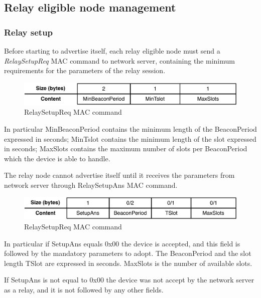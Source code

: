 \subsection{Relay eligible node management}

\subsubsection{Relay setup}

Before starting to advertise itself, each relay eligible node must send a \emph{RelaySetupReq} MAC command to network server, containing the minimum requirements for the parameters of the relay session.

\begin{figure}[!h]
\centering
\includegraphics[width=\textwidth]{img/commands/RelaySetupReq}
\caption{RelaySetupReq MAC command}
\label{fig:relaysetupreq}
\end{figure}

In particular MinBeaconPeriod contains the minimum length of the BeaconPeriod expressed in seconds; MinTslot contains the minimum length of the slot expressed in seconds; MaxSlots contains the maximum number of slots per BeaconPeriod which the device is able to handle.

The relay node cannot advertise itself until it receives the parameters from network server through RelaySetupAns MAC command.

\begin{figure}[!h]
\centering
\includegraphics[width=\textwidth]{img/commands/RelaySetupAns}
\caption{RelaySetupReq MAC command}
\label{fig:relaysetupans}
\end{figure}

In particular if SetupAns equals 0x00 the device is accepted, and this field is followed by the mandatory parameters to adopt. The BeaconPeriod and the slot length TSlot are expressed in seconds. MaxSlots is the number of available slots.

If SetupAns is not equal to 0x00 the device was not accept by the network server as a relay, and it is not followed by any other fields.





